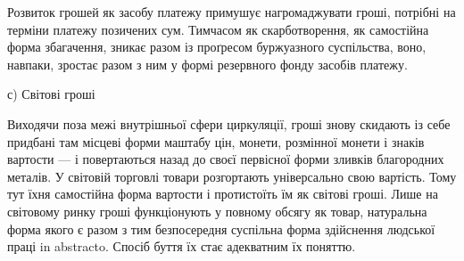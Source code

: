Розвиток грошей як засобу платежу примушує нагромаджувати
гроші, потрібні на терміни платежу позичених сум. Тимчасом
як скарботворення, як самостійна форма збагачення, зникає
разом із проґресом буржуазного суспільства, воно, навпаки,
зростає разом з ним у формі резервного фонду засобів платежу.

с) Світові гроші

Виходячи поза межі внутрішньої сфери циркуляції, гроші
знову скидають із себе придбані там місцеві форми маштабу
цін, монети, розмінної монети і знаків вартости — і повертаються
назад до своєї первісної форми зливків благородних
металів. У світовій торговлі товари розгортають універсально
свою вартість. Тому тут їхня самостійна форма вартости і протистоїть
їм як світові гроші. Лише на світовому ринку гроші функціонують
у повному обсягу як товар, натуральна форма якого
є разом з тим безпосередня суспільна форма здійснення людської
праці in abstracto. Спосіб буття їх стає адекватним їх поняттю.

